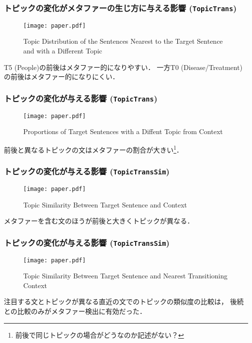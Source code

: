 \documentclass[11pt,usepdftitle=false]{beamer}
\begin{document}
\begin{frame}
    \frametitle{トピックの変化がメタファーの生じ方に与える影響 (\texttt{TopicTrans})}
    \begin{figure}
        \centering
        \caption{Topic Distribution of the Sentences Nearest to the
            Target Sentence and with a Different Topic}
            \texttt{[image: paper.pdf]}
    \end{figure}

    T5 (People)の前後はメタファー的になりやすい．
    一方T0 (Disease/Treatment)の前後はメタファー的になりにくい．
\end{frame}

\begin{frame}
    \frametitle{トピックの変化が与える影響 (\texttt{TopicTrans})}
    \begin{figure}
        \centering
        \caption{Proportions of Target Sentences with a Diffent Topic from Context}
        \texttt{[image: paper.pdf]}
    \end{figure}

    前後と異なるトピックの文はメタファーの割合が大きい\footnote{前後で同じトピックの場合がどうなのか記述がない？}．
\end{frame}

\begin{frame}
    \frametitle{トピックの変化が与える影響 (\texttt{TopicTransSim})}
    \begin{figure}
        \centering
        \caption{Topic Similarity Between Target Sentence and Context}
        \texttt{[image: paper.pdf]}
    \end{figure}
    メタファーを含む文のほうが前後と大きくトピックが異なる．
\end{frame}

\begin{frame}
    \frametitle{トピックの変化が与える影響 (\texttt{TopicTransSim})}
    \begin{figure}
        \centering
        \caption{Topic Similarity Between Target Sentence and Nearest Transitioning Context}
        \texttt{[image: paper.pdf]}
    \end{figure}
    注目する文とトピックが異なる直近の文でのトピックの類似度の比較は，
    後続との比較のみがメタファー検出に有効だった．
\end{frame}
\end{document}
